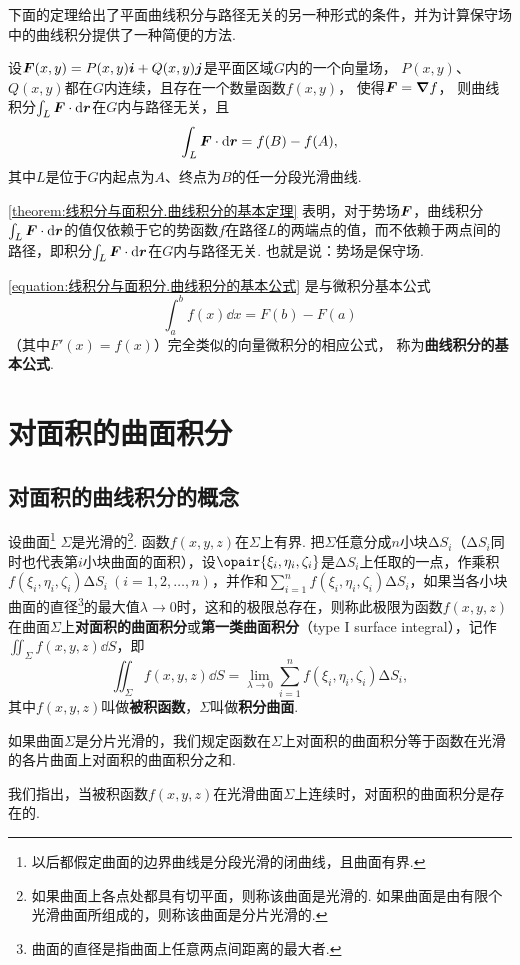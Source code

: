 下面的定理给出了平面曲线积分与路径无关的另一种形式的条件，并为计算保守场中的曲线积分提供了一种简便的方法.
\begin{theorem}[曲线积分的基本定理]\label{theorem:线积分与面积分.曲线积分的基本定理}
设\(\boldsymbol{F}(x,y)=P(x,y)\boldsymbol{i}+Q(x,y)\boldsymbol{j}\)是平面区域\(G\)内的一个向量场，%
\(P(x,y)\)、\(Q(x,y)\)都在\(G\)内连续，且存在一个数量函数\(f(x,y)\)，%
使得\(\boldsymbol{F}=\grad{f}\)，%
则曲线积分\(\int_L{\boldsymbol{F}\cdot\dd{\boldsymbol{r}}}\)在\(G\)内与路径无关，且
\begin{equation}\label{equation:线积分与面积分.曲线积分的基本公式}
\int_L \boldsymbol{F} \cdot \dd{\boldsymbol{r}}
= f(B)-f(A),
\end{equation}
其中\(L\)是位于\(G\)内起点为\(A\)、终点为\(B\)的任一分段光滑曲线.
\end{theorem}
\cref{theorem:线积分与面积分.曲线积分的基本定理} 表明，对于势场\(\boldsymbol{F}\)，曲线积分\(\int_L \boldsymbol{F}\cdot\dd{\boldsymbol{r}}\)的值仅依赖于它的势函数\(f\)在路径\(L\)的两端点的值，而不依赖于两点间的路径，即积分\(\int_L \boldsymbol{F}\cdot\dd{\boldsymbol{r}}\)在\(G\)内与路径无关.
也就是说：势场是保守场.

\cref{equation:线积分与面积分.曲线积分的基本公式}
是与微积分基本公式\[
\int_a^b f(x) \dd{x}
= F(b) - F(a)
\]（其中\(F'(x) = f(x)\)）完全类似的向量微积分的相应公式，%
称为\textbf{曲线积分的基本公式}.

\section{对面积的曲面积分}
\subsection{对面积的曲线积分的概念}
\begin{definition}
设曲面\footnote{以后都假定曲面的边界曲线是分段光滑的闭曲线，且曲面有界.}%
\(\Sigma\)是光滑的\footnote{如果曲面上各点处都具有切平面，则称该曲面是光滑的.
如果曲面是由有限个光滑曲面所组成的，则称该曲面是分片光滑的.}.
函数\(f(x,y,z)\)在\(\Sigma\)上有界.
把\(\Sigma\)任意分成\(n\)小块\(\increment S_i\)（\(\increment S_i\)同时也代表第\(i\)小块曲面的面积），设\(\opair{\xi_i,\eta_i,\zeta_i}\)是\(\increment S_i\)上任取的一点，作乘积\(f(\xi_i,\eta_i,\zeta_i) \increment S_i\ (i=1,2,\dotsc,n)\)，并作和\(\sum\limits_{i=1}^n f(\xi_i,\eta_i,\zeta_i) \increment S_i\)，如果当各小块曲面的直径\footnote{曲面的直径是指曲面上任意两点间距离的最大者.}的最大值\(\lambda\to0\)时，这和的极限总存在，则称此极限为函数\(f(x,y,z)\)在曲面\(\Sigma\)上\textbf{对面积的曲面积分}或\textbf{第一类曲面积分}（type I surface integral），记作\(\iint_{\Sigma}{f(x,y,z)\dd{S}}\)，即\[
\iint_{\Sigma} f(x,y,z)\dd{S}
= \lim\limits_{\lambda\to0} \sum\limits_{i=1}^n f(\xi_i,\eta_i,\zeta_i) \increment S_i,
\]其中\(f(x,y,z)\)叫做\textbf{被积函数}，\(\Sigma\)叫做\textbf{积分曲面}.

如果曲面\(\Sigma\)是分片光滑的，我们规定函数在\(\Sigma\)上对面积的曲面积分等于函数在光滑的各片曲面上对面积的曲面积分之和.
\end{definition}
我们指出，当被积函数\(f(x,y,z)\)在光滑曲面\(\Sigma\)上连续时，对面积的曲面积分是存在的.

